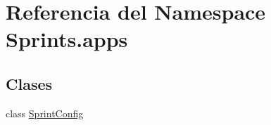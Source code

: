 \hypertarget{namespace_sprints_1_1apps}{}\section{Referencia del Namespace Sprints.\+apps}
\label{namespace_sprints_1_1apps}
\subsection*{Clases}
\begin{DoxyCompactItemize}
\item 
class \hyperlink{class_sprints_1_1apps_1_1_sprint_config}{Sprint\+Config}
\end{DoxyCompactItemize}
